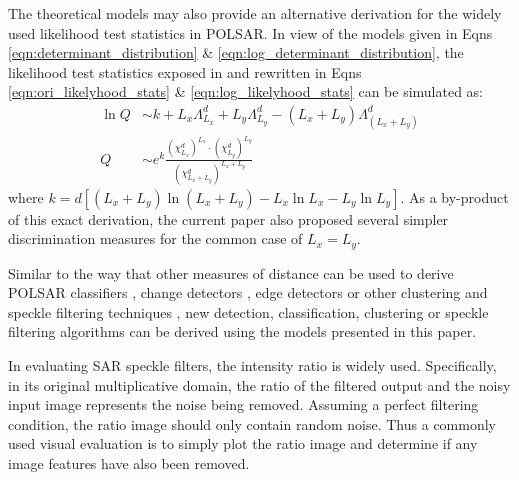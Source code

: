 \documentclass[journal]{IEEEtran}
\begin{document}
The theoretical models may also provide an alternative derivation for the widely used likelihood test statistics in POLSAR.
In view of the models given in Eqns \ref{eqn:determinant_distribution} \& \ref{eqn:log_determinant_distribution},
  the likelihood test statistics exposed in \cite{Conradsen_2003_TGRS_4} and rewritten in Eqns \ref{eqn:ori_likelyhood_stats} \& \ref{eqn:log_likelyhood_stats}
can be simulated as:
\begin{align*}
  \ln{Q} &\sim  k + L_x \Lambda^d_{L_x} + L_y \Lambda^d_{L_y} - (L_x + L_y) \Lambda^d_{(L_x + L_y)} \\
  Q &\sim e^k \frac{(\chi^d_{L_x})^{L_x} \cdot (\chi^d_{L_y})^{L_y}}{(\chi^d_{L_x + L_y})^{L_x + L_y}}   
\end{align*}
where $k = d \left[ (L_x + L_y) \ln(L_x + L_y) - L_x \ln{L_x} - L_y \ln{L_y} \right]$.
As a by-product of this exact derivation, the current paper also proposed several simpler discrimination measures for the common case of $L_x=L_y$.

Similar to the way that other measures of distance can be used to derive POLSAR classifiers \cite{Lee_1999_TGRS}, change detectors \cite{Conradsen_2003_TGRS_4}, edge detectors \cite{Schou_2003_TGRS_20} or other clustering and speckle filtering techniques \cite{Le_2010_ACRS} \cite{Le_2011_ACRS}, 
new detection, classification, clustering or speckle filtering algorithms can be derived using the models presented in this paper.

%
In evaluating SAR speckle filters, the intensity ratio is widely used.
Specifically, in its original multiplicative domain, the ratio of the filtered output and the noisy input image represents the noise being removed.
Assuming a perfect filtering condition, the ratio image should only contain random noise.
Thus a commonly used visual evaluation is to simply plot the ratio image and determine if any image features have also been removed.
\end{document}
